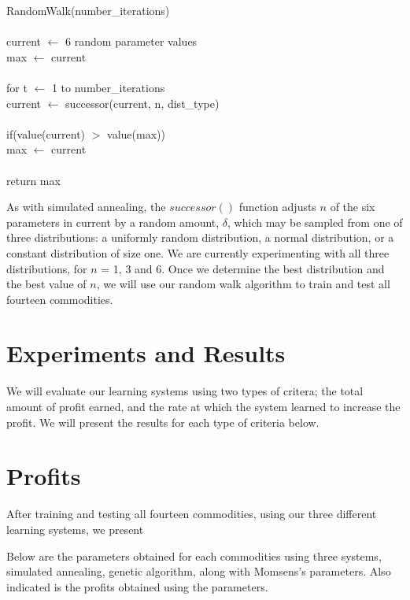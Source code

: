 \documentclass[10pt]{article}
\begin{document}
\setlength{\parindent}{5mm}
\indent RandomWalk(number\_iterations)\\\\
\indent \indent current $\leftarrow$ 6 random parameter values\\
\indent \indent max $\leftarrow$ current\\\\
\indent \indent for t $\leftarrow$ 1 to number\_iterations\\
\indent \indent \indent current $\leftarrow$ successor(current, n, dist\_type)\\\\
\indent \indent \indent if(value(current) $>$ value(max))\\
\indent \indent \indent \indent max $\leftarrow$ current\\\\
\indent \indent return max\\
\setlength{\parindent}{0mm}

As with simulated annealing, the $successor()$ function adjusts $n$ of the six
parameters in current by a random amount, $\delta$, which may be sampled from
one of three distributions: a uniformly random distribution, a normal
distribution, or a constant distribution of size one. We are currently
experimenting with all three distributions, for $n$ = 1, 3 and 6. Once we
determine the best distribution and the best value of $n$, we will use our
random walk algorithm to train and test all fourteen commodities.

\section{Experiments and Results}

We will evaluate our learning systems using two types of critera; the total amount
of profit earned, and the rate at which the system learned to increase the
profit. We will present the results for each type of criteria below.

\section{Profits}

After training and testing all fourteen commodities, using our three different learning systems, we present 

Below are the parameters obtained for each commodities using three
systems, simulated annealing, genetic algorithm, along with Momsens's
parameters.  Also indicated is the profits obtained using the parameters.
\end{document}
